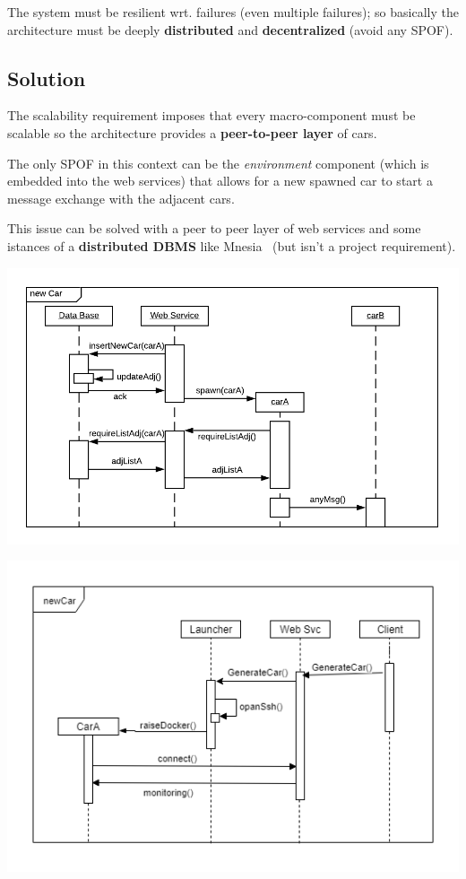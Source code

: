 The system must be resilient wrt. failures (even multiple failures);
so basically the architecture must be deeply \textbf{distributed} 
and \textbf{decentralized} (avoid any SPOF). 


\subsection{Solution}

The scalability requirement imposes that every macro-component must be scalable 
so the architecture provides a \textbf{peer-to-peer layer} of cars.

The only SPOF in this context can be the \textit{environment} component 
(which is embedded into the web services) that allows for a new spawned car to 
start a message exchange with the adjacent cars. 

This issue can be solved 
with a peer to peer layer of web services and some istances of a 
\textbf{distributed DBMS} like Mnesia~\cite{1} (but isn't a project requirement).

\begin{center}
    \includegraphics[scale=0.8]{assets/ds2019_1.png}
\end{center}

\begin{center}
    \includegraphics[scale=0.6]{assets/newCarclient.png}
\end{center}

